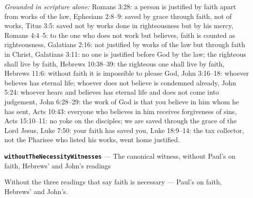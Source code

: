 \documentclass[11pt]{article}
\begin{document}
\emph{Grounded in scripture alone:} Romans 3:28: a person is justified by faith apart from works of the law, Ephesians 2:8–9: saved by grace through faith, not of works, Titus 3:5: saved not by works done in righteousness but by his mercy, Romans 4:4–5: to the one who does not work but believes, faith is counted as righteousness, Galatians 2:16: not justified by works of the law but through faith in Christ, Galatians 3:11: no one is justified before God by the law; the righteous shall live by faith, Hebrews 10:38–39: the righteous one shall live by faith, Hebrews 11:6: without faith it is impossible to please God, John 3:16–18: whoever believes has eternal life; whoever does not believe is condemned already, John 5:24: whoever hears and believes has eternal life and does not come into judgement, John 6:28–29: the work of God is that you believe in him whom he has sent, Acts 10:43: everyone who believes in him receives forgiveness of sins, Acts 15:10–11: no yoke on the disciples; we are saved through the grace of the Lord Jesus, Luke 7:50: your faith has saved you, Luke 18:9–14: the tax collector, not the Pharisee who listed his works, went home justified.
\par\medskip\noindent\textbf{\texttt{without\allowbreak{}The\allowbreak{}Necessity\allowbreak{}Witnesses}} --- The canonical witness, without Paul's on faith, Hebrews' and John's readings\par\nobreak\noindent
Without the three readings that say faith is necessary — Paul's on faith, Hebrews' and John's.
\end{document}

